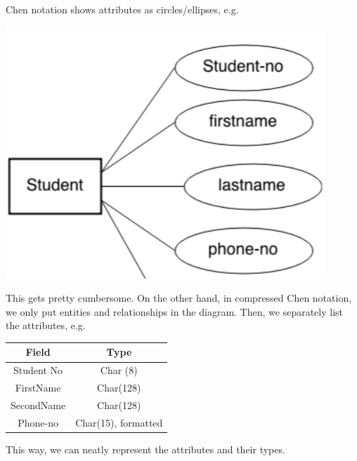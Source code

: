 \documentclass[a4paper, openany]{memoir}
\begin{document}
Chen notation shows attributes as circles/ellipses, e.g.
\begin{center}
    \includegraphics[scale=0.8]{src/L10I3.PNG}
\end{center}
This gets pretty cumbersome. On the other hand, in compressed Chen notation, we only put entities and relationships in the diagram. Then, we separately list the attributes, e.g.
\begin{center}
    \begin{tabular}{|c|c|}
        \hline
        Field & Type \\
        \hline
        Student No & Char (8) \\
        \hline
        FirstName & Char(128) \\
        \hline
        SecondName & Char(128) \\
        \hline
        Phone-no & Char(15), formatted \\
        \hline
    \end{tabular}
\end{center}
This way, we can neatly represent the attributes and their types.
\end{document}
